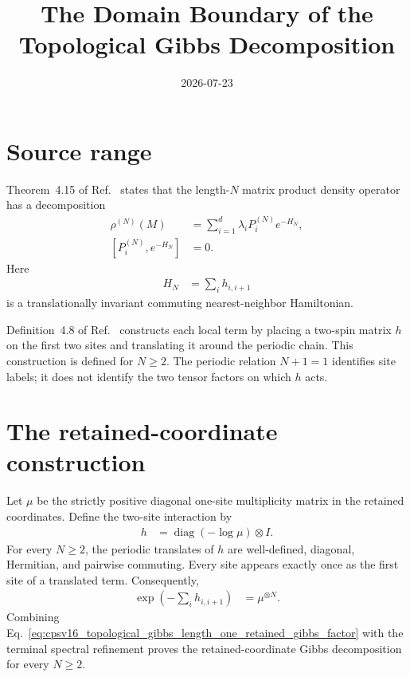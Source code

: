 \documentclass{article}
\title{The Domain Boundary of the Topological Gibbs Decomposition}
\author{}
\date{2026-07-23}
\begin{document}
\maketitle
{}

\section{Source range}

Theorem~4.15 of Ref.~\cite[lines~999--1016]{Cirac2016MPDO_arXiv} states that
the length-$N$ matrix product density operator has a decomposition
\begin{align}
    \rho^{(N)}(M)
        &= \sum_{i=1}^{d}\lambda_iP_i^{(N)}e^{-H_N},
    \label{eq:cpsv16_topological_gibbs_length_one_source_decomposition}\\
    [P_i^{(N)},e^{-H_N}]
        &= 0.
    \label{eq:cpsv16_topological_gibbs_length_one_source_commutation}
\end{align}
Here
\begin{align}
    H_N
        &= \sum_i h_{i,i+1}
    \label{eq:cpsv16_topological_gibbs_length_one_source_hamiltonian}
\end{align}
is a translationally invariant commuting nearest-neighbor Hamiltonian.

Definition~4.8 of Ref.~\cite[lines~829--847]{Cirac2016MPDO_arXiv} constructs
each local term by placing a two-spin matrix $h$ on the first two sites and
translating it around the periodic chain. This construction is defined for
$N\geq2$. The periodic relation $N+1=1$ identifies site labels; it does not
identify the two tensor factors on which $h$ acts.

\section{The retained-coordinate construction}

Let $\mu$ be the strictly positive diagonal one-site multiplicity matrix in
the retained coordinates. Define the two-site interaction by
\begin{align}
    h
        &= \operatorname{diag}(-\log\mu)\otimes I.
    \label{eq:cpsv16_topological_gibbs_length_one_retained_interaction}
\end{align}
For every $N\geq2$, the periodic translates of $h$ are well-defined,
diagonal, Hermitian, and pairwise commuting. Every site appears exactly once
as the first site of a translated term. Consequently,
\begin{align}
    \exp\left(-\sum_i h_{i,i+1}\right)
        &= \mu^{\otimes N}.
    \label{eq:cpsv16_topological_gibbs_length_one_retained_gibbs_factor}
\end{align}
Combining
Eq.~\ref{eq:cpsv16_topological_gibbs_length_one_retained_gibbs_factor} with
the terminal spectral refinement proves the retained-coordinate Gibbs
decomposition for every $N\geq2$.
\end{document}
